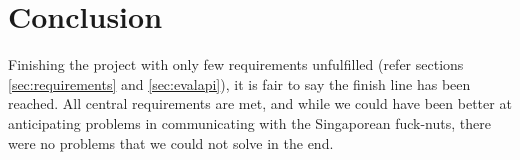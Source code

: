 \section{Conclusion}
Finishing the project with only few requirements unfulfilled (refer sections
\ref{sec:requirements} and \ref{sec:evalapi}), it is fair to say the finish
line has been reached. All central requirements are met, and while we could
have been better at anticipating problems in communicating with the
Singaporean fuck-nuts, there were no problems that we could not solve in the end.
